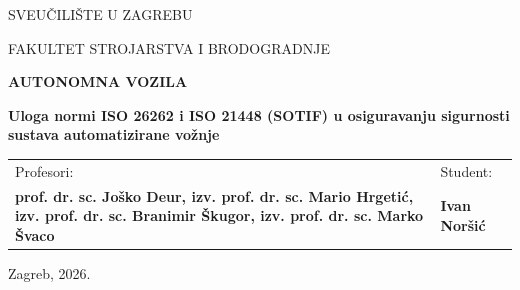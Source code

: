 \documentclass[12pt,a4paper]{article}
\newcommand{\univname}{SVEUČILIŠTE U ZAGREBU}
\newcommand{\facultyname}{FAKULTET STROJARSTVA I BRODOGRADNJE}
\newcommand{\coursename}{AUTONOMNA VOZILA}
\newcommand{\seminartitle}{Uloga normi ISO 26262 i ISO 21448 (SOTIF) u osiguravanju sigurnosti sustava automatizirane vožnje}
\newcommand{\professorname}{prof. dr. sc. Joško Deur, izv. prof. dr. sc. Mario Hrgetić, izv. prof. dr. sc. Branimir Škugor, izv. prof. dr. sc. Marko Švaco}
\newcommand{\authorname}{Ivan Noršić}
\newcommand{\locationdate}{Zagreb, 2026.}
\begin{document}
\begin{titlepage}
  \centering
  {\fontsize{14}{17}\selectfont \univname \par}
  {\fontsize{14}{17}\selectfont \facultyname \par}
  \vfill
  {\fontsize{28}{34}\bfseries \coursename \par}
  \vspace{0.8cm}
  {\fontsize{14}{18}\bfseries \seminartitle \par}
  \vfill
  \begin{tabular}{p{}>{\raggedleft\arraybackslash}p{}}
    \textmd{Profesori:} & \textmd{Student:} \\[0.3cm]
    \textbf{\professorname} & \textbf{\authorname}
  \end{tabular}
  \vspace{1.5cm}
  \par
  {\normalfont \locationdate \par}
\end{titlepage}

\setcounter{page}{1}

\tableofcontents
\clearpage



\setcounter{page}{1}














\clearpage


\end{document}
